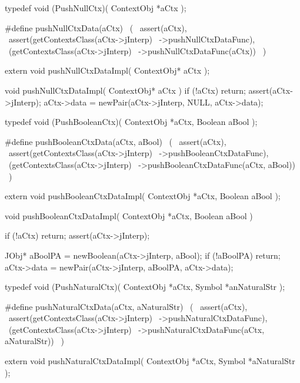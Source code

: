 \startCHeader
typedef void (PushNullCtx)(
  ContextObj *aCtx
);

#define pushNullCtxData(aCtx)               \
  (                                         \
    assert(aCtx),                           \
    assert(getContextsClass(aCtx->jInterp)  \
      ->pushNullCtxDataFunc),               \
    (getContextsClass(aCtx->jInterp)        \
      ->pushNullCtxDataFunc(aCtx))          \
  )
\stopCHeader

\setCHeaderStream{private}
\startCHeader
extern void pushNullCtxDataImpl(
  ContextObj* aCtx
);
\stopCHeader
{}

\startCCode
void pushNullCtxDataImpl(
  ContextObj* aCtx
) {
  if (!aCtx) return;
  assert(aCtx->jInterp);
  aCtx->data = newPair(aCtx->jInterp, NULL, aCtx->data);
}
\stopCCode

\startCHeader
typedef void (PushBooleanCtx)(
  ContextObj *aCtx,
  Boolean     aBool
);

#define pushBooleanCtxData(aCtx, aBool)      \
  (                                          \
    assert(aCtx),                            \
    assert(getContextsClass(aCtx->jInterp)   \
      ->pushBooleanCtxDataFunc),             \
    (getContextsClass(aCtx->jInterp)         \
      ->pushBooleanCtxDataFunc(aCtx, aBool)) \
  )
\stopCHeader

\startCHeader
extern void pushBooleanCtxDataImpl(
  ContextObj *aCtx,
  Boolean     aBool
);
\stopCHeader
\setCHeaderStream{public}

\startCCode
void pushBooleanCtxDataImpl(
  ContextObj *aCtx,
  Boolean     aBool
) {
  if (!aCtx) return;
  assert(aCtx->jInterp);

  JObj* aBoolPA = newBoolean(aCtx->jInterp, aBool);
  if (!aBoolPA) return;
  aCtx->data = newPair(aCtx->jInterp, aBoolPA, aCtx->data);
}
\stopCCode

\startCHeader
typedef void (PushNaturalCtx)(
  ContextObj *aCtx,
  Symbol     *anNaturalStr
);

#define pushNaturalCtxData(aCtx, aNaturalStr)      \
  (                                                \
    assert(aCtx),                                  \
    assert(getContextsClass(aCtx->jInterp)         \
      ->pushNaturalCtxDataFunc),                   \
    (getContextsClass(aCtx->jInterp)               \
      ->pushNaturalCtxDataFunc(aCtx, aNaturalStr)) \
  )
\stopCHeader

\startCHeader
extern void pushNaturalCtxDataImpl(
  ContextObj *aCtx,
  Symbol     *aNaturalStr
);
\stopCHeader
{}

